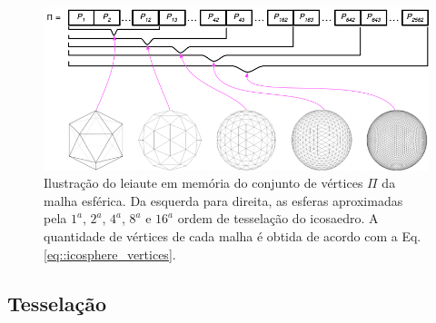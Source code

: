  \begin{figure}[ht]
    \centering
    \includegraphics[width=1.0\linewidth, angle=0]{figs/Esquema_Glifo/icosaedro_blocos.png}
    \caption{Ilustração do leiaute em memória do conjunto de vértices $\Pi$ da malha esférica. Da esquerda para direita, as esferas aproximadas pela $1^a$, $2^a$, $4^a$, $8^a$ e $16^a$ ordem de tesselação do icosaedro. A quantidade de vértices de cada malha é obtida de acordo com a Eq. \ref{eq::icosphere_vertices}.}
     \label{fig::icosaedro_blocos}
\end{figure}



\subsection{Tesselação}
\label{ssec:tesselacao}

